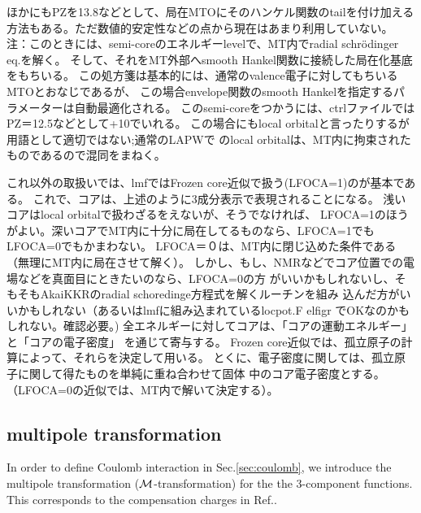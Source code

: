 \documentclass[a4paper,10pt,aip,onecolumn,amsmath,amssymb,floatfix,rmp]{revtex4-1}
\def\MM{{\cal M}}
\begin{document}
\begin{widetext}
{\small 
ほかにもPZを13.8などとして、局在MTOにそのハンケル関数のtailを付け加える
方法もある。ただ数値的安定性などの点から現在はあまり利用していない。
注：このときには、semi-coreのエネルギーlevelで、MT内でradial schr\"odinger eq.を解く。
そして、それをMT外部へsmooth Hankel関数に接続した局在化基底をもちいる。
この処方箋は基本的には、通常のvalence電子に対してもちいるMTOとおなじであるが、
この場合envelope関数のsmooth Hankelを指定するパラメーターは自動最適化される。
このsemi-coreをつかうには、ctrlファイルではPZ＝12.5などとして+10でいれる。
この場合にもlocal orbitalと言ったりするが用語として適切ではない;通常のLAPWで
のlocal orbitalは、MT内に拘束されたものであるので混同をまねく。
}

これ以外の取扱いでは、lmfではFrozen core近似で扱う(LFOCA=1)のが基本である。
これで、コアは、上述のように3成分表示で表現されることになる。
浅いコアはlocal orbitalで扱わざるをえないが、そうでなければ、
LFOCA=1のほうがよい。深いコアでMT内に十分に局在してるものなら、LFOCA=1でもLFOCA=0でもかまわない。
LFOCA＝０は、MT内に閉じ込めた条件である（無理にMT内に局在させて解く）。
しかし、もし、NMRなどでコア位置での電場などを真面目にときたいのなら、LFOCA=0の方
がいいかもしれないし、そもそもAkaiKKRのradial schoredinge方程式を解くルーチンを組み
込んだ方がいいかもしれない（あるいはlmfに組み込まれているlocpot.F elfigr
でOKなのかもしれない。確認必要。)
全エネルギーに対してコアは、「コアの運動エネルギー」と「コアの電子密度」
を通じて寄与する。
Frozen core近似では、孤立原子の計算によって、それらを決定して用いる。
とくに、電子密度に関しては、孤立原子に関して得たものを単純に重ね合わせて固体
中のコア電子密度とする。（LFOCA=0の近似では、MT内で解いて決定する）。


\subsection{multipole transformation}
\label{sec:multi} In order to define Coulomb interaction in
Sec.\ref{sec:coulomb}, we introduce the multipole transformation
($\MM$-transformation) for the the 3-component functions.  This
corresponds to the compensation charges in Ref.\cite{PAW}.


\end{widetext}
\end{document}
